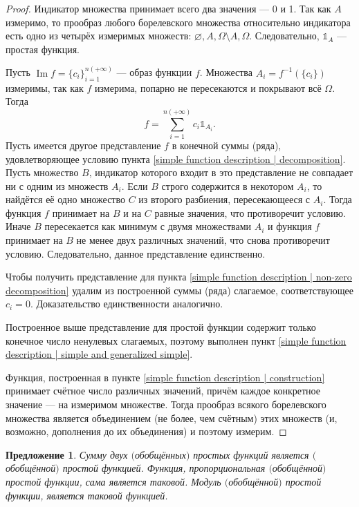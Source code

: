 \documentclass[12pt]{article}
\newtheorem{proposition}[theorem]{Предложение}
\numberwithin{theorem}{section}
\theoremstyle{definition}
\newcommand{\Image}{\operatorname{Im}}
\newcommand{\ind}{\mathds{1}}
\begin{document}
	\begin{proof}
		Индикатор множества принимает всего два значения --- 0 и 1.
		Так как $ A $ измеримо, то прообраз любого борелевского множества относительно индикатора
		есть одно из четырёх измеримых множеств: $ \varnothing, A, \Omega \setminus A, \Omega $.
		Следовательно, $ \ind_{A} $ --- простая функция.
		
		Пусть $ \Image f = \{c_i\}_{i = 1}^{n (+\infty)} $ --- образ функции $ f $.
		Множества $ A_i = f^{-1}(\{c_i\}) $ измеримы, так как $ f $ измерима, 
		попарно не пересекаются и покрывают всё $ \Omega $.
		Тогда $$ f = \sum\limits_{i = 1}^{n (+\infty)} c_i\ind_{A_i}. $$
		Пусть имеется другое представление $ f $ в конечной суммы (ряда), 
		удовлетворяющее условию пункта \ref{simple function description | decomposition}.
		Пусть множество $ B $, индикатор которого входит в это представление не совпадает ни с одним из множеств $ A_i $.
		Если $ B $ строго содержится в некотором $ A_i $, то найдётся её одно множество $ C $ из второго разбиения, 
		пересекающееся с $ A_i $. Тогда функция $ f $ принимает на $ B $ и на $ C $ равные значения, что противоречит условию.
		Иначе $ B $ пересекается как минимум с двумя множествами $ A_i $ 
		и функция $ f $ принимает на $ B $ не менее двух различных значений, что снова противоречит условию.
		Следовательно, данное представление единственно.
		
		Чтобы получить представление для пункта \ref{simple function description | non-zero decomposition}
		удалим из построенной суммы (ряда) слагаемое, соответствующее $ c_i = 0 $.
		Доказательство единственности аналогично.
		
		Построенное выше представление для простой функции содержит только конечное число ненулевых слагаемых,
		поэтому выполнен пункт \ref{simple function description | simple and generalized simple}.
		
		Функция, построенная в пункте \ref{simple function description | construction} принимает счётное число различных значений,
		причём каждое конкретное значение --- на измеримом множестве.
		Тогда прообраз всякого борелевского множества является объединением (не более, чем счётным) этих множеств
		(и, возможно, дополнения до их объединения) и поэтому измерим.
	\end{proof}
	
	\begin{proposition}
		Сумму двух $ ( $обобщённых$ ) $ простых функций является $ ( $обобщённой$ ) $ простой функцией.
		Функция, пропорциональная $ ( $обобщённой$ ) $ простой функции, сама является таковой.
		Модуль $ ( $обобщённой$ ) $ простой функции, является таковой функцией.
	\end{proposition}
\end{document}
